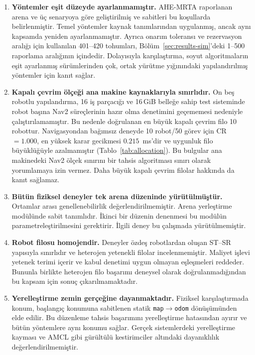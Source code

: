 \documentclass[10pt,letterpaper,onecolumn]{IEEEtran}
\begin{document}
\begin{enumerate}
  \item \textbf{Yöntemler eşit düzeyde ayarlanmamıştır.} AHE-MRTA raporlanan
  arena ve üç senaryoya göre geliştirilmiş ve sabitleri bu koşullarda
  belirlenmiştir. Temel yöntemler kaynak tanımlarından uygulanmış, ancak aynı
  kapsamda yeniden ayarlanmamıştır. Ayrıca onarım toleransı ve rezervasyon
  aralığı için kullanılan 401--420 tohumları, Bölüm~\ref{sec:results-sim}'deki
  1--500 raporlama aralığının içindedir. Dolayısıyla karşılaştırma, soyut
  algoritmaların eşit ayarlanmış sürümlerinden çok, ortak yürütme yığınındaki
  yapılandırılmış yöntemler için kanıt sağlar.

  \item \textbf{Kapalı çevrim ölçeği ana makine kaynaklarıyla sınırlıdır.}
  On beş robotlu yapılandırma, 16 iş parçacığı ve 16\,GiB belleğe sahip test
  sisteminde robot başına Nav2 süreçlerinin hazır olma denetimini geçememesi
  nedeniyle çalıştırılamamıştır. Bu nedenle doğrulanan en büyük kapalı çevrim
  filo 10 robottur. Navigasyondan bağımsız deneyde 10 robot/50 görev için
  CR${=}1.000$, en yüksek karar gecikmesi $0.215$~ms'dir ve uygunluk filo
  büyüklüğüyle azalmamıştır (Tablo~\ref{tab:allocation}). Bu bulgular ana
  makinedeki Nav2 ölçek sınırını bir tahsis algoritması sınırı olarak
  yorumlamaya izin vermez. Daha büyük kapalı çevrim filolar hakkında da kanıt
  sağlamaz.

  \item \textbf{Bütün fiziksel deneyler tek arena düzeninde yürütülmüştür.}
  Ortamlar arası genellenebilirlik değerlendirilmemiştir. Arena yerleştirme
  modülünde sabit tanımlıdır. İkinci bir düzenin denenmesi bu modülün
  parametreleştirilmesini gerektirir. İlgili deney bu çalışmada
  yürütülmemiştir.

  \item \textbf{Robot filosu homojendir.} Deneyler özdeş robotlardan oluşan
  ST--SR yapısıyla sınırlıdır ve heterojen yetenekli filolar incelenmemiştir.
  Maliyet işlevi yetenek terimi içerir ve kabul denetimi uygun olmayan
  eşleşmeleri reddeder. Bununla birlikte heterojen filo başarımı deneysel
  olarak doğrulanmadığından bu kapsam için sonuç çıkarılmamaktadır.

  \item \textbf{Yerelleştirme zemin gerçeğine dayanmaktadır.} Fiziksel
  karşılaştırmada konum, başlangıç konumuna sabitlenen statik
  \texttt{map}$\to$\texttt{odom} dönüşümünden elde edilir. Bu düzenleme tahsis
  başarımını yerelleştirme hatasından ayırır ve bütün yöntemlere aynı konumu
  sağlar. Gerçek sistemlerdeki yerelleştirme kayması ve AMCL gibi gürültülü
  kestirimciler altındaki dayanıklılık değerlendirilmemiştir.


\end{enumerate}
\end{document}
